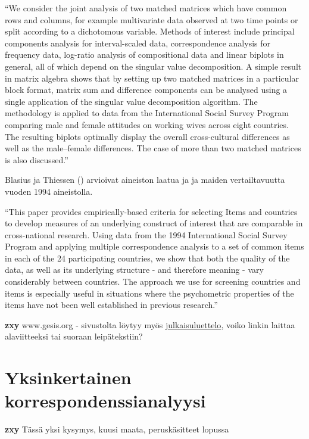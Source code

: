 \documentclass[finnish,]{book}
\theoremstyle{definition}
\theoremstyle{definition}
\theoremstyle{definition}
\theoremstyle{remark}
\begin{document}
``We consider the joint analysis of two matched matrices which have
common rows and columns, for example multivariate data observed at two
time points or split according to a dichotomous variable. Methods of
interest include principal components analysis for interval-scaled data,
correspondence analysis for frequency data, log-ratio analysis of
compositional data and linear biplots in general, all of which depend on
the singular value decomposition. A simple result in matrix algebra
shows that by setting up two matched matrices in a particular block
format, matrix sum and difference components can be analysed using a
single application of the singular value decomposition algorithm. The
methodology is applied to data from the International Social Survey
Program comparing male and female attitudes on working wives across
eight countries. The resulting biplots optimally display the overall
cross-cultural differences as well as the male--female differences. The
case of more than two matched matrices is also discussed.''

Blasius ja Thiessen (\citep{RefWorks:doc:5b15542ee4b0e2616bc42dca})
arvioivat aineiston laatua ja ja maiden vertailtavuutta vuoden 1994
aineistolla.

``This paper provides empirically-based criteria for selecting Items and
countries to develop measures of an underlying construct of interest
that are comparable in cross-national research. Using data from the 1994
International Social Survey Program and applying multiple correspondence
analysis to a set of common items in each of the 24 participating
countries, we show that both the quality of the data, as well as its
underlying structure - and therefore meaning - vary considerably between
countries. The approach we use for screening countries and items is
especially useful in situations where the psychometric properties of the
items have not been well established in previous research.''

\textbf{zxy} www.gesis.org - sivustolta löytyy myös
\href{https://search.gesis.org/research_data/ZA5900}{julkaisuluettelo},
voiko linkin laittaa alaviitteeksi tai suoraan leipätekstiin?

\hypertarget{yksinkertainen-korrespondenssianalyysi}{%
\chapter{Yksinkertainen
korrespondenssianalyysi}\label{yksinkertainen-korrespondenssianalyysi}}

\textbf{zxy} Tässä yksi kysymys, kuusi maata, peruskäsitteet lopussa
\end{document}
